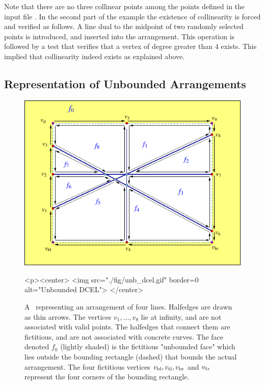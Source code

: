 
Note that there are no three collinear points among the points defined
in the input file . In the second part of the example
the existence of collinearity is forced and verified as follows. A line
dual to the midpoint of two randomly selected points is introduced,
and inserted into the arrangement. This operation is followed by a
test that verifies that a vertex of degree greater than $4$
exists. This implied that collinearity indeed exists as explained above.

\begin{ccAdvanced}

\subsection{Representation of Unbounded Arrangements\label{arr_ssec:unb_rep}}

\begin{figure}[t]
\begin{ccTexOnly}
  \begin{center}
  \includegraphics{Arrangement_on_surface_2/fig/unb_dcel}
  \end{center}
\end{ccTexOnly}
\begin{ccHtmlOnly}
  <p><center>
  <img src="./fig/unb_dcel.gif" border=0 alt="Unbounded DCEL">
  </center>
\end{ccHtmlOnly}
\caption{A \dcel\ representing an arrangement of four lines.
Halfedges are drawn as thin arrows. The vertices $v_1, \ldots, v_8$
lie at infinity, and are not associated with valid points. The
halfedges that connect them are fictitious, and are not associated
with concrete curves. The face denoted $f_0$ (lightly shaded)
is the fictitious "unbounded face" which lies outside the bounding
rectangle (dashed) that bounds the actual arrangement. The four
fictitious vertices $v_{\rm bl}, v_{\rm tl}, v_{\rm br}$ and
$v_{\rm tr}$ represent the four corners of the bounding
rectangle.\label{arr_fig:unb_dcel}}
\end{figure}


\end{ccAdvanced}
